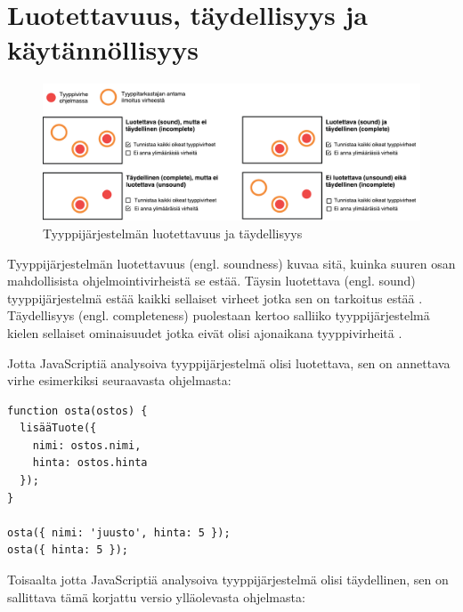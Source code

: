 \section{Luotettavuus, täydellisyys ja käytännöllisyys}

\begin{figure}
\includegraphics[width=\textwidth]{images/soundness_completeness2.pdf}
\caption{Tyyppijärjestelmän luotettavuus ja täydellisyys}
\end{figure}

Tyyppijärjestelmän luotettavuus (engl. soundness) kuvaa sitä, kuinka suuren osan
mahdollisista ohjelmointivirheistä se estää. Täysin luotettava (engl. sound)
tyyppijärjestelmä estää kaikki sellaiset virheet jotka sen on tarkoitus
estää \cite{CSE_ProgrammingLanguages}. Täydellisyys (engl. completeness)
puolestaan kertoo salliiko tyyppijärjestelmä kielen sellaiset ominaisuudet
jotka eivät olisi ajonaikana tyyppivirheitä \cite{TypesAndProgrammingLanguages, CSE_ProgrammingLanguages}.

Jotta JavaScriptiä analysoiva tyyppijärjestelmä olisi luotettava, sen on
annettava virhe esimerkiksi seuraavasta ohjelmasta:

\begin{minipage}{\linewidth}
\begin{lstlisting}[caption={Virheellinen JavaScript-ohjelma: Lisätyllä tuotteella ei ole nimeä.},label={fig:soundness_test}]
function osta(ostos) {
  lisääTuote({
    nimi: ostos.nimi,
    hinta: ostos.hinta
  });
}

osta({ nimi: 'juusto', hinta: 5 });
osta({ hinta: 5 });
\end{lstlisting}
\end{minipage}

Toisaalta jotta JavaScriptiä analysoiva tyyppijärjestelmä olisi täydellinen,
sen on sallittava tämä korjattu versio ylläolevasta ohjelmasta:

